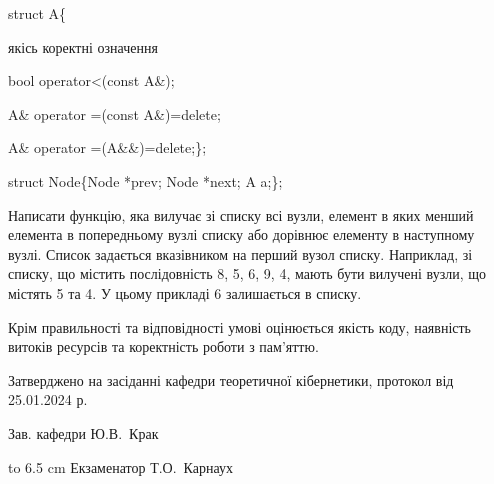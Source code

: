 \documentclass[12pt, ukrainian]{article}
\begin{document}
{struct A\{

\quad  якісь коректні означення 

\quad  bool operator<(const A\&); 

\quad A\& operator =(const A\&)=delete; 

\quad  A\& operator =(A\&\&)=delete;\};

struct Node\{Node *prev; Node *next; A a;\};

Написати функцію, яка вилучає зі списку всі вузли, елемент в яких менший елемента в попередньому вузлі списку або дорівнює елементу в наступному вузлі. Список задається вказівником на перший вузол списку. Наприклад, зі списку, що містить послідовність 8, 5, 6, 9, 4, мають бути вилучені вузли, що містять 5 та 4. У цьому прикладі 6 залишається в списку.

Крім правильності та відповідності умові оцінюється якість коду, наявність витоків ресурсів та коректність роботи з пам'яттю. 

}
{\smallskip\smallskip \begin {scriptsize} Затверджено на засіданні кафедри теоретичної кібернетики, протокол   від   25.01.2024 р.\par\smallskip\smallskip\smallskip\smallskip
{\parbox {6.5 cm} {Зав. кафедри \dotfill Ю.В.~Крак}}\hspace {0.7cm} {\hbox to 6.5 cm { Екзаменатор \dotfill Т.О.~Карнаух}} \end{scriptsize}}
\newpage
\end{document}
